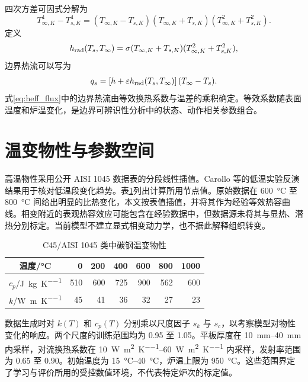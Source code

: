 四次方差可因式分解为
\begin{equation}
  T_{\infty,K}^{4}-T_{s,K}^{4}
  =(T_{\infty,K}-T_{s,K})(T_{\infty,K}+T_{s,K})
  (T_{\infty,K}^{2}+T_{s,K}^{2}).
\end{equation}
定义
\begin{equation}
  h_{\mathrm{rad}}(T_s,{T_{\infty}})
  =\sigma(T_{\infty,K}+T_{s,K})(T_{\infty,K}^{2}+T_{s,K}^{2}),
  \label{eq:hrad}
\end{equation}
边界热流可以写为
\begin{equation}
  q_s=\left[h+\varepsilon h_{\mathrm{rad}}(T_s,{T_{\infty}})\right]({T_{\infty}}-T_s).
  \label{eq:heff_flux}
\end{equation}
式\eqref{eq:heff_flux}中的边界热流由等效换热系数与温差的乘积确定。等效系数随表面温度和炉温变化，是边界可辨识性分析中的状态、动作相关参数组合。

\section{温变物性与参数空间}

高温物性采用公开 AISI 1045 数据表的分段线性插值\cite{sanchez2023splat}。Carollo 等的低温实验反演结果用于核对低温段变化趋势\cite{carollo2019properties}。表\ref{tab:properties}列出计算所用节点值。原始数据在 \SI{600}{\degreeCelsius} 至 \SI{800}{\degreeCelsius} 间给出明显的比热变化，本文按表值插值，并将其作为经验等效热容曲线。相变附近的表观热容效应可能包含在经验数据中，但数据源未将其与显热、潜热分别标定。当前模型不建立显式相变动力学，也不据此解释组织转变。

\begin{table}[H]
  \centering
  \caption{C45/AISI 1045 类中碳钢温变物性}
  \label{tab:properties}
  \begin{tabular}{c*{6}{r}}
    \toprule
    温度/\si{\degreeCelsius} & 0 & 200 & 400 & 600 & 800 & 1000 \\
    \midrule
    $c_p$/\si{\joule\per\kilogram\per\kelvin} & 510 & 600 & 725 & 900 & 562 & 600 \\
    $k$/\si{\watt\per\metre\per\kelvin} & 45 & 41 & 36 & 32 & 27 & 23 \\
    \bottomrule
  \end{tabular}
\end{table}

数据生成时对 $k(T)$ 和 $c_p(T)$ 分别乘以尺度因子 $s_k$ 与 $s_c$，以考察模型对物性变化的响应。两个尺度的训练范围均为 0.95 至 1.05。平板厚度在 \SIrange{10}{40}{\milli\metre} 内采样，对流换热系数在 \SIrange{10}{60}{\watt\per\square\metre\per\kelvin} 内采样，发射率范围为 $0.65$ 至 $0.90$。初始温度为 \SIrange{15}{40}{\degreeCelsius}，炉温上限为 \SI{950}{\degreeCelsius}。这些范围界定了学习与评价所用的受控数值环境，不代表特定炉次的标定值。

